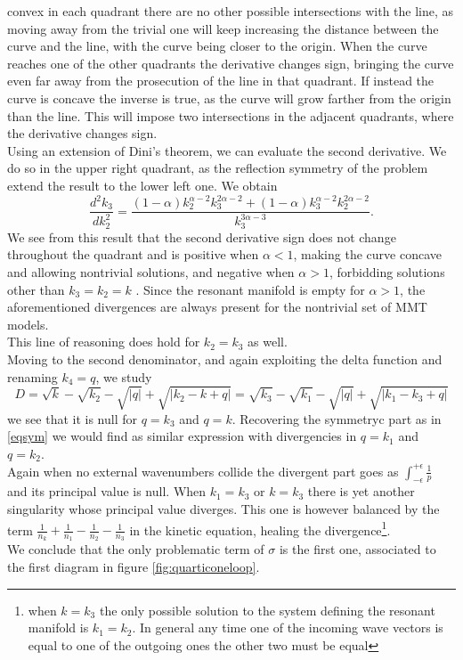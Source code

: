     convex in each quadrant there are no other possible intersections with the line, as moving away from the trivial one will keep increasing the distance between the curve and the line, with the curve being closer to the origin. When the curve reaches one of the other quadrants the derivative changes sign, bringing the curve even far away from the prosecution of the line in that quadrant. If instead the curve is concave the inverse is true, as the curve will grow farther from the origin than the line. This will impose two intersections in the adjacent quadrants, where the derivative changes sign.\\
    Using an extension of Dini's theorem, we can evaluate the second derivative. We do so in the upper right quadrant, as the reflection symmetry of the problem extend the result to the lower left one. We obtain 
    \begin{equation}
        \frac{d^2k_3}{dk_2^2} = \frac{(1-\alpha)k_2^{\alpha-2}k_3^{2\alpha-2} + (1-\alpha)k_3^{\alpha-2}k_2^{2\alpha-2}}{k_3^{3\alpha-3}}.
    \end{equation}   
    We see from this result that the second derivative sign does not change throughout the quadrant and is positive when $\alpha < 1 $, making the curve concave and allowing nontrivial solutions, and negative when $\alpha > 1$, forbidding solutions other than $k_3 = k_2 = k$ . Since the resonant manifold is empty for $\alpha>1$, the aforementioned divergences are always present for the nontrivial set of MMT models.\\
    This line of reasoning does hold for $k_2 = k_3$ as well.\\

    Moving to the second denominator, and again exploiting the delta function and renaming $k_4 = q$, we study
    \begin{equation}
      D = \sqrt{k} - \sqrt{k_2} - \sqrt{|q|} + \sqrt{|k_2-k + q|} = \sqrt{k_3} - \sqrt{k_1} - \sqrt{|q|} + \sqrt{|k_1-k_3 + q|}
    \end{equation}
    we see that it is null for $q = k_3$ and $q = k$. Recovering the symmetryc part as in \eqref{eqsym} we would find as similar expression with divergencies in $q = k_1$ and $q = k_2$. \\
    Again when no external wavenumbers collide the divergent part goes as $\int_{-\epsilon}^{+\epsilon}\frac{1}{p}$ and its principal value is null. When $k_1 = k_3$ or $k = k_3$ there is yet another singularity whose principal value diverges. This one is however balanced by the term $\frac{1}{n_k} + \frac{1}{n_1} -\frac{1}{n_2} -\frac{1}{n_3}$ in the kinetic equation, healing the divergence\footnote{
    when $k = k_3$ the only possible solution to the system defining the resonant manifold is $k_1 = k_2$.
    In general any time one of the incoming wave vectors is equal to one of the outgoing ones the other two must be equal}.\\
    We conclude that the only problematic term of $\sigma$ is the first one, associated to the first diagram in figure \ref{fig:quarticoneloop}. \\
    
